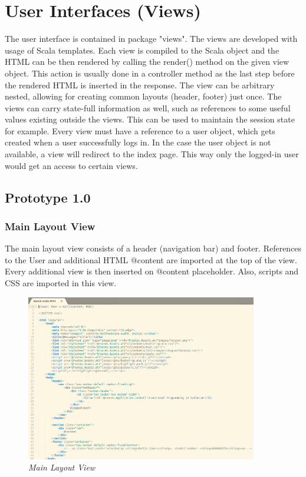 \documentclass[12pt,twoside,a4paper]{report}
\begin{document}
\section{User Interfaces (Views)}\label{4.3}
The user interface is contained in package "views". The views are developed with usage of Scala templates. Each view is compiled to the Scala object and the HTML can be then rendered by calling the render() method on the given view object. This action is usually done in a controller method as the last step before the rendered HTML is inserted in the response. The view can be arbitrary nested, allowing for creating common layouts (header, footer) just once. The views can carry state-full information as well, such as references to some useful values existing outside the views. This can be used to maintain the session state for example. Every view must have a reference to a user object, which gets created when a user successfully logs in. In the case the user object is not available, a view will redirect to the index page. This way only the logged-in user would get an access to certain views.

\subsection{Prototype 1.0}\label{4.3.1}

\subsubsection{Main Layout View}\label{4.3.1.1}
The main layout view consists of a header (navigation bar) and footer. References to the User and additional HTML @content are imported at the top of the view. Every additional view is then inserted on @content placeholder. Also, scripts and CSS are imported in this view.
\begin{figure}[!ht]
	\centering
		\includegraphics[width=0.9\textwidth, totalheight=8cm]
		{main_layout_view}
	\caption{\textit{Main Layout View}}
	\label{f4.3.1.1}
\end{figure}
\end{document}
